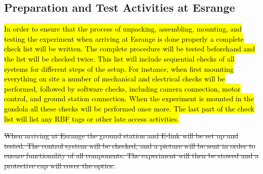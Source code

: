 \subsection{Preparation and Test Activities at Esrange}\label{prep_for_Esrange}
\hl{In order to ensure that the process of unpacking, assembling, mounting, and testing the experiment when arriving at Esrange is done properly a complete check list will be written. The complete procedure will be tested beforehand and the list will be checked twice. This list will include sequential checks of all systems for different steps of the setup. For instance, when first mounting everything on site a number of mechanical and electrical checks will be performed, followed by software checks, including camera connection, motor control, and ground station connection. When the experiment is mounted in the gondola all these checks will be performed once more. The last part of the check list will list any RBF tags or other late access activities.}


\st{When arriving at Esrange the ground station and E-link will be set up and tested. The control system will be checked, and a picture will be sent in order to ensure functionality of all components. The experiment will then be stowed and a protective cap will cover the optics.}
